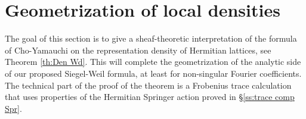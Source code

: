 \documentclass[reqno]{amsart}
\numberwithin{equation}{section}
\theoremstyle{remark}
\numberwithin{equation}{section}
\begin{document}
\section{Geometrization of local densities}\label{s:geom density}
The goal of this section is to give a sheaf-theoretic interpretation of the formula of Cho-Yamauchi on the representation density of Hermitian lattices, see Theorem \ref{th:Den Wd}. This will complete the geometrization of the analytic side of our proposed Siegel-Weil formula, at least for non-singular Fourier coefficients. The technical part of the proof of the theorem is a Frobenius trace calculation that uses properties of the Hermitian Springer action proved in \S\ref{ss:trace comp Spr}.

\end{document}
